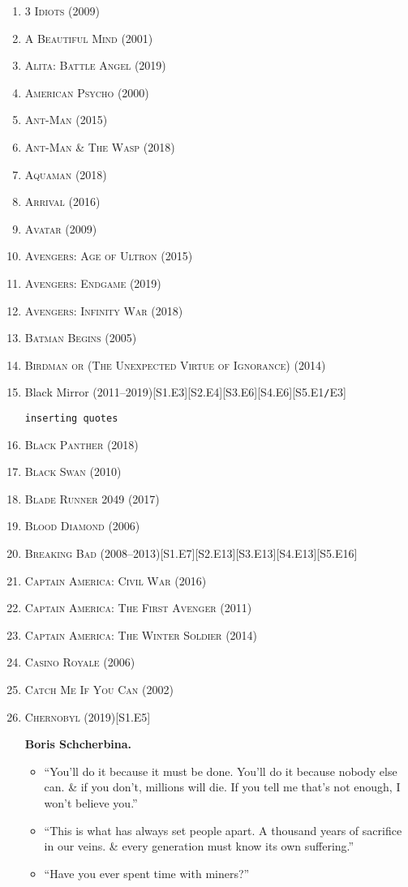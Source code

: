 \documentclass[oneside]{book}
\numberwithin{equation}{section}
\begin{document}
\begin{enumerate}
	\item \textsc{3 Idiots} (2009)
	\item \textsc{A Beautiful Mind} (2001)
	\item \textsc{Alita: Battle Angel} (2019)
	\item \textsc{American Psycho} (2000)
	\item \textsc{Ant-Man} (2015)
	\item \textsc{Ant-Man \& The Wasp} (2018)
	\item \textsc{Aquaman} (2018)
	\item \textsc{Arrival} (2016)
	\item \textsc{Avatar} (2009)
	\item \textsc{Avengers: Age of Ultron} (2015)
	\item \textsc{Avengers: Endgame} (2019)
	\item \textsc{Avengers: Infinity War} (2018)
	\item \textsc{Batman Begins} (2005)
	\item \textsc{Birdman or (The Unexpected Virtue of Ignorance)} (2014)
	\item Black Mirror (2011--2019)\hfill[S1.E3][S2.E4][S3.E6][S4.E6][S5.E1\texttt{/}E3]
	
	\texttt{inserting quotes}
	\item \textsc{Black Panther} (2018)
	\item \textsc{Black Swan} (2010)
	\item \textsc{Blade Runner 2049} (2017)
	\item \textsc{Blood Diamond} (2006)
	\item \textsc{Breaking Bad} (2008--2013)\hfill[S1.E7][S2.E13][S3.E13][S4.E13][S5.E16]
	\item \textsc{Captain America: Civil War} (2016)
	\item \textsc{Captain America: The First Avenger} (2011)
	\item \textsc{Captain America: The Winter Soldier} (2014)
	\item \textsc{Casino Royale} (2006)
	\item \textsc{Catch Me If You Can} (2002)
	\item \textsc{Chernobyl} (2019)\hfill[S1.E5]
	
	\textbf{Boris Schcherbina.}
	\begin{itemize}
		\item ``You'll do it because it must be done. You'll do it because nobody else can. \& if you don't, millions will die. If you tell me that's not enough, I won't believe you.''
		\item ``This is what has always set people apart. A thousand years of sacrifice in our veins. \& every generation must know its own suffering.''
		\item ``Have you ever spent time with miners?''
		

\end{itemize}
\end{enumerate}
\end{document}

